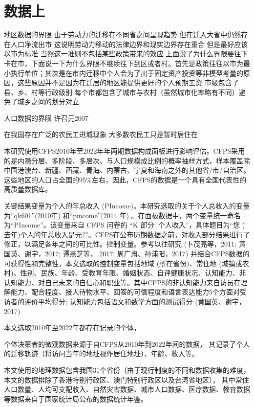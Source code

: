 \documentclass[a4paper, zihao=-4, fontset = mac, oneside]{ctexbook} %
\begin{document}
\section{数据上}

地区数据的界限
由于劳动力的迁移在不同省之间呈现趋势 但在迁入大省中仍然存在人口净流出市 这说明劳动力移动的法律边界和现实边界存在重合 但是最好应该以市为标准 当然这一准则不包括某些政策带来的效应
上面说了为什么界限要往下卡在市，下面说一下为什么界限不继续往下到区或者村。首先是政策往往以市为最小执行单位；其次是在市内迁移中个人会为了出于固定资产投资等非模型考量的原因，这些原因并不是因为在迁居的地区能提供更好的个人预期工资
市级包含了县、乡、村等行政级别 每个市都包含了城市与农村（虽然城市化率略有不同）避免了城乡之间的划分对立


人口数据的界限
许召元2007

在我国存在广泛的农民工进城现象 大多数农民工只是暂时居住在


本研究使用CFPS2010年至2022年年两期数据构成面板进行影响评估。CFPS采用的是内隐分层、多阶段、多层次、与人口规模成比例的概率抽样方式，样本覆盖除中国港澳台、新疆、西藏、青海、内蒙古、宁夏和海南之外的其他省/市/自治区。这些地区的人口占全国的95\%左右，因此，CFPS的数据是一个具有全国代表性的高质量数据库。

关键结果变量为个人的年总收入 (PIncome)。本研究选取的关于个人总收入的变量为“qk601”(2010年) 和“pincome”(2014 年) 。在面板数据中，两个变量统一命名为“PIncome”。该变量来自 CFPS 问卷的 “K 部分: 个人收入”，具体题目为“您 ( 去年)个人的年总收入是元?”。CFPS在公布历期数据之前，对收入部分结果进行了修正，以满足各年之间的可比性。控制变量。参考以往研究 (卜茂亮等，2011; 黄国英、谢宇，2017; 谭燕芝等， 2017; 周广肃、孙浦阳，2017) 并结合CFPS数据的可获得性和完整性，本文选取的控制变量包括地域 (所在省份)、常住地 (城镇或农村)、性别、民族、年龄、受教育年限、婚姻状态、自评健康状况、认知能力、非认知能力、对自己未来的自信心和职业等。其中CFPS的非认知能力来自访员在理解能力、配合程度、接人待物水平、回答的可信程度和语言表达能力5个方面对受访者的评价平均得分; 认知能力包括语文和数学方面的测试得分 (黄国英、谢宇，2017)

本文选取2010年至2022年都存在记录的个体，

个体决策者的微观数据来源于自CFPS从2010年到2022年间的数据，
其记录了个人的迁移轨迹（将访问当年的地址视作居住地址）、年龄、收入等。


本文使用的地理数据包含我国31个省份（由于现行制度的不同和数据收集的难度，本文的数据排除了香港特别行政区、澳门特别行政区以及台湾省地区），
其中常住人口数量、人均可支配收入、自然灾害数据、城市人口数据、医疗数据、教育数据等数据来自于国家统计局公布的数据统计年鉴。
\end{document}
